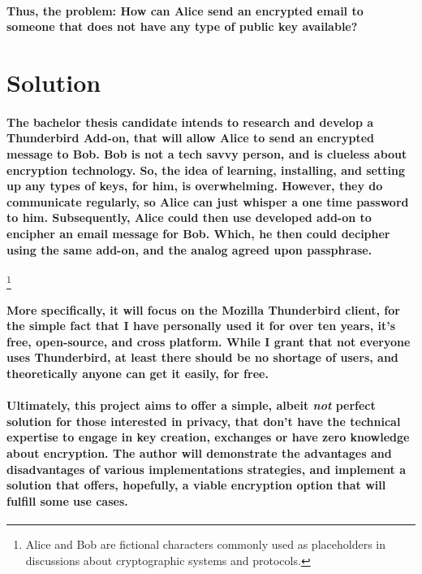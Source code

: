 \paragraph{Thus, the problem: How can Alice send an encrypted email to someone that does not have any type of public key available?}

\section{Solution}

\paragraph{The bachelor thesis candidate intends to research and develop a Thunderbird Add-on, that will allow Alice to send an encrypted message to Bob. Bob is not a tech savvy person, and is clueless about encryption technology. So, the idea of learning, installing, and setting up any types of keys, for him, is overwhelming. However, they do communicate regularly, so Alice can just whisper a one time password to him. Subsequently, Alice could then use developed add-on to encipher an email message for Bob. Which, he then could decipher using the same add-on, and the analog agreed upon passphrase.}\footnote{Alice and Bob are fictional characters commonly used as placeholders in discussions about cryptographic systems and protocols.}

\paragraph{More specifically, it will focus on the Mozilla Thunderbird client, for the simple fact that I have personally used it for over ten years, it's free, open-source, and cross platform. While I grant that not everyone uses Thunderbird, at least there should be no shortage of users, and theoretically anyone can get it easily, for free.}

\paragraph{Ultimately, this project aims to offer a simple, albeit \emph{not} perfect solution for those interested in privacy, that don't have the technical expertise to engage in key creation, exchanges or have zero knowledge about encryption. The author will demonstrate the advantages and disadvantages of various implementations strategies, and implement a solution that offers, hopefully, a viable encryption option that will fulfill some use cases.}

